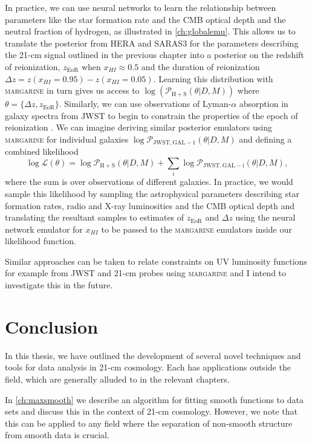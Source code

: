 In practice, we can use neural networks to learn the relationship between parameters like the star formation rate and the CMB optical depth and the neutral fraction of hydrogen, as illustrated in \cref{ch:globalemu}. This allows us to translate the posterior from HERA and SARAS3 for the parameters describing the 21-cm signal outlined in the previous chapter into a posterior on the redshift of reionization, $z_\mathrm{EoR}$ when $x_{HI} \approx 0.5$ and the duration of reionization $\Delta z = z(x_{HI} = 0.95) - z(x_{HI} = 0.05)$. Learning this distribution with \textsc{margarine} in turn gives us access to $\log(\mathcal{P}_\mathrm{H+S}(\theta|D, M))$ where $\theta = \{\Delta z, z_\mathrm{EoR}\}$. Similarly, we can use observations of Lyman-$\alpha$ absorption in galaxy spectra from JWST to begin to constrain the properties of the epoch of reionization \cite{Curtis_Lake2022}. We can imagine deriving similar posterior emulators using \textsc{margarine} for individual galaxies $\log\mathcal{P}_\mathrm{JWST, GAL-1}(\theta|D, M)$ and defining a combined likelihood
\begin{equation}
    \log \mathcal{L}(\theta) = \log \mathcal{P}_\mathrm{H+S}(\theta|D, M) + \sum_i \log\mathcal{P}_\mathrm{JWST, GAL-i}(\theta|D, M),
\end{equation}
where the sum is over observations of different galaxies. In practice, we would sample this likelihood by sampling the astrophysical parameters describing star formation rates, radio and X-ray luminosities and the CMB optical depth and translating the resultant samples to estimates of $z_\mathrm{EoR}$ and $\Delta z$ using the neural network emulator for $x_{HI}$ to be passed to the \textsc{margarine} emulators inside our likelihood function.

Similar approaches can be taken to relate constraints on UV luminosity functions for example from JWST and 21-cm probes using \textsc{margarine} and I intend to investigate this in the future.

\section{Conclusion}

In this thesis, we have outlined the development of several novel techniques and tools for data analysis in 21-cm cosmology. Each has applications outside the field, which are generally alluded to in the relevant chapters. 

In \cref{ch:maxsmooth} we describe an algorithm for fitting smooth functions to data sets and discuss this in the context of 21-cm cosmology. However, we note that this can be applied to any field where the separation of non-smooth structure from smooth data is crucial. 

